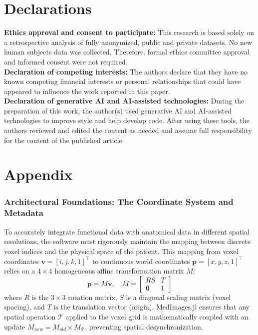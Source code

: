 \documentclass[a4paper,10pt,preprint]{elsarticle}
\begin{document}
\section*{Declarations}
\textbf{Ethics approval and consent to participate:} This research is based solely on a retrospective analysis of fully anonymized, public and private  datasets. No new human subjects data was collected. Therefore, formal ethics committee approval and informed consent were not required. \\
\textbf{Declaration of competing interests:} The authors declare that they have no known competing financial interests or personal relationships that could have appeared to influence the work reported in this paper. \\
\textbf{Declaration of generative AI and AI-assisted technologies:} During the preparation of this work, the author(s) used generative AI and AI-assisted technologies to improve style and help develop code. After using these tools, the authors reviewed and edited the content as needed and assume full responsibility for the content of the published article.





\section{Appendix}

\subsubsection{Architectural Foundations: The Coordinate System and Metadata}
To accurately integrate functional data with anatomical data in different spatial resolutions, the software must rigorously maintain the mapping between discrete voxel indices and the physical space of the patient. This mapping from voxel coordinates $\mathbf{v} = [i, j, k, 1]^\top$ to continuous world coordinates $\mathbf{p} = [x, y, z, 1]^\top$ relies on a $4 \times 4$ homogeneous affine transformation matrix $M$:
\begin{equation}
\mathbf{p} = M \mathbf{v}, \quad M = 
\begin{bmatrix} 
R S & T \\
\mathbf{0} & 1
\end{bmatrix}
\end{equation}
where $R$ is the $3 \times 3$ rotation matrix, $S$ is a diagonal scaling matrix (voxel spacing), and $T$ is the translation vector (origin). MedImages.jl ensures that any spatial operation $\mathcal{T}$ applied to the voxel grid is mathematically coupled with an update $M_{new} = M_{old} \times M_{\mathcal{T}}$, preventing spatial desynchronization.
\end{document}
